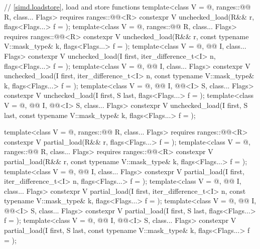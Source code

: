 \begin{codeblock}
{  // \ref{simd.loadstore},  load and store functions
  template<class V = @\seebelow@, ranges::@@ R, class... Flags>
    requires ranges::@@<R>
    constexpr V unchecked_load(R&& r, flags<Flags...> f = {});
  template<class V = @\seebelow@, ranges::@@ R, class... Flags>
    requires ranges::@@<R>
    constexpr V unchecked_load(R&& r, const typename V::mask_type& k,
                               flags<Flags...> f = {});
  template<class V = @\seebelow@, @@ I, class... Flags>
    constexpr V unchecked_load(I first, iter_difference_t<I> n,
                               flags<Flags...> f = {});
  template<class V = @\seebelow@, @@ I, class... Flags>
    constexpr V unchecked_load(I first, iter_difference_t<I> n,
                               const typename V::mask_type& k, flags<Flags...> f = {});
  template<class V = @\seebelow@, @@ I, @@<I> S, class... Flags>
    constexpr V unchecked_load(I first, S last, flags<Flags...> f = {});
  template<class V = @\seebelow@, @@ I, @@<I> S, class... Flags>
    constexpr V unchecked_load(I first, S last, const typename V::mask_type& k,
                               flags<Flags...> f = {});

  template<class V = @\seebelow@, ranges::@@ R, class... Flags>
    requires ranges::@@<R>
    constexpr V partial_load(R&& r, flags<Flags...> f = {});
  template<class V = @\seebelow@, ranges::@@ R, class... Flags>
    requires ranges::@@<R>
    constexpr V partial_load(R&& r, const typename V::mask_type& k,
                             flags<Flags...> f = {});
  template<class V = @\seebelow@, @@ I, class... Flags>
    constexpr V partial_load(I first, iter_difference_t<I> n, flags<Flags...> f = {});
  template<class V = @\seebelow@, @@ I, class... Flags>
    constexpr V partial_load(I first, iter_difference_t<I> n,
                             const typename V::mask_type& k, flags<Flags...> f = {});
  template<class V = @\seebelow@, @@ I, @@<I> S, class... Flags>
    constexpr V partial_load(I first, S last, flags<Flags...> f = {});
  template<class V = @\seebelow@, @@ I, @@<I> S, class... Flags>
    constexpr V partial_load(I first, S last, const typename V::mask_type& k,
                             flags<Flags...> f = {});

}
\end{codeblock}
